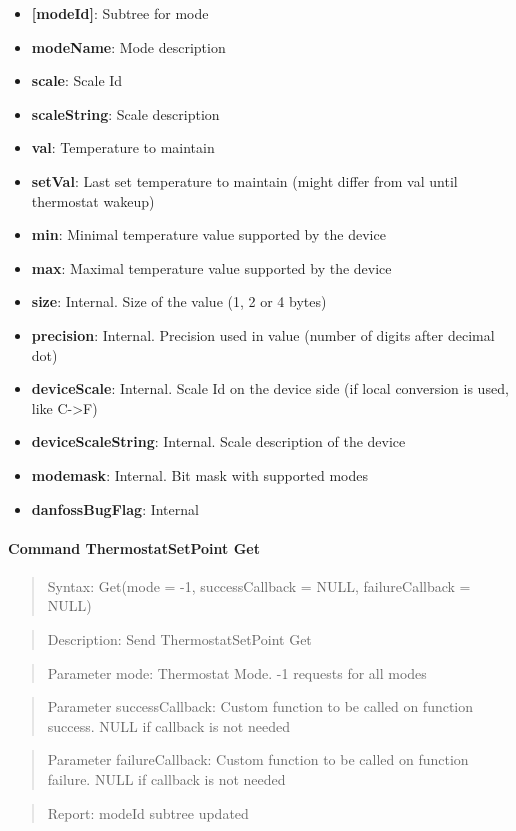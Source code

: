 \begin{itemize}
\item \textbf{[modeId]}: Subtree for mode
\item \qquad\textbf{modeName}: Mode description
\item \qquad\textbf{scale}: Scale Id
\item \qquad\textbf{scaleString}: Scale description
\item \qquad\textbf{val}: Temperature to maintain
\item \qquad\textbf{setVal}: Last set temperature to maintain (might differ from val until thermostat wakeup)
\item \qquad\textbf{min}: Minimal temperature value supported by the device
\item \qquad\textbf{max}: Maximal temperature value supported by the device
\item \qquad\textbf{size}: Internal. Size of the value (1, 2 or 4 bytes)
\item \qquad\textbf{precision}: Internal. Precision used in value (number of digits after decimal dot)
\item \qquad\textbf{deviceScale}: Internal. Scale Id on the device side (if local conversion is used, like C->F)
\item \qquad\textbf{deviceScaleString}: Internal. Scale description of the device
\item \textbf{modemask}: Internal. Bit mask with supported modes
\item \textbf{danfossBugFlag}: Internal
\end{itemize}

\paragraph{Command ThermostatSetPoint Get}
\begin{quote}Syntax: Get(mode = -1, successCallback = NULL, failureCallback = NULL)\end{quote}
\begin{quote}Description: Send ThermostatSetPoint Get\end{quote}
\begin{quote}Parameter mode: Thermostat Mode. -1 requests for all modes\end{quote}
\begin{quote}Parameter successCallback: Custom function to be called on function success. NULL if callback is not needed\end{quote}
\begin{quote}Parameter failureCallback: Custom function to be called on function failure. NULL if callback is not needed\end{quote}
\begin{quote}Report: modeId subtree updated\end{quote}

